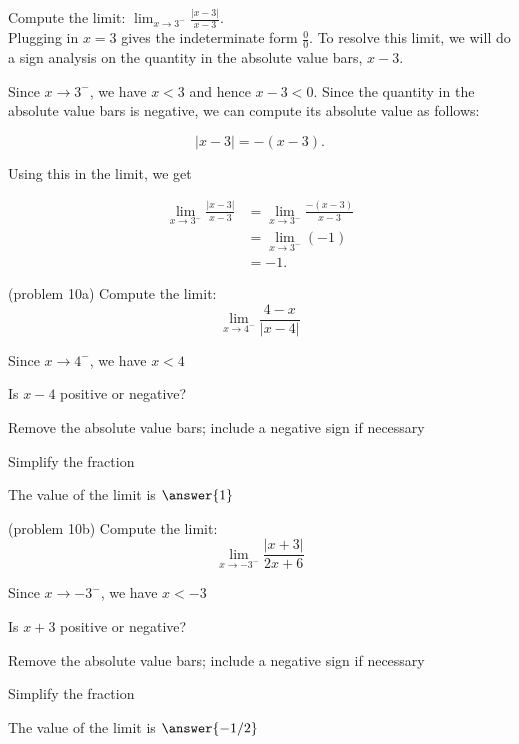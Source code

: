 \documentclass[handout]{ximera}
\begin{document}
\begin{example}[example 10]
Compute the limit: $\displaystyle{\lim_{x \to 3^{-}} \frac{|x-3|}{x-3}}$.\\
Plugging in $x = 3$ gives the indeterminate form $\frac00$. To resolve this limit, 
we will do a sign analysis on the quantity in the absolute value bars, $x-3$.

Since $x \to 3^-$, we have $x<3$ and hence $x-3 <0$. Since the quantity in the absolute value bars is negative, 
we can compute its absolute value as follows:

\[|x-3| = -(x-3).\]

Using this in the limit, we get

\begin{align*}
\lim_{x \to 3^-} \frac{|x-3|}{x-3} &= \lim_{x \to 3^-} \frac{-(x-3)}{x-3} \\[.4 em]
&= \lim_{x \to 3^-} (-1) \\
&= -1.
\end{align*}
\end{example}

\begin{problem}(problem 10a)
  Compute the limit:
  \[
  \lim_{x \to 4^-} \frac{4-x}{|x-4|}
  \]
  
    \begin{hint}
      Since $x \to 4^-$, we have $x<4$
    \end{hint}
    \begin{hint}
      Is $x-4$ positive or negative?
    \end{hint}
    \begin{hint}
      Remove the absolute value bars; include a negative sign if necessary
    \end{hint}
		\begin{hint}
      Simplify the fraction
    \end{hint}
		The value of the limit is
		 $\answer{1}$
		
\end{problem}


\begin{problem}(problem 10b)
  Compute the limit:
  \[
  \lim_{x \to -3^-} \frac{|x+3|}{2x+6}
  \]
  
    \begin{hint}
      Since $x \to -3^-$, we have $x<-3$
    \end{hint}
    \begin{hint}
      Is $x+3$ positive or negative?
    \end{hint}
    \begin{hint}
      Remove the absolute value bars; include a negative sign if necessary
    \end{hint}
		\begin{hint}
      Simplify the fraction
    \end{hint}
		The value of the limit is
		 $\answer{-1/2}$
		
\end{problem}


\begin{center}
\begin{foldable}
\end{foldable}
\end{center}
\end{document}

